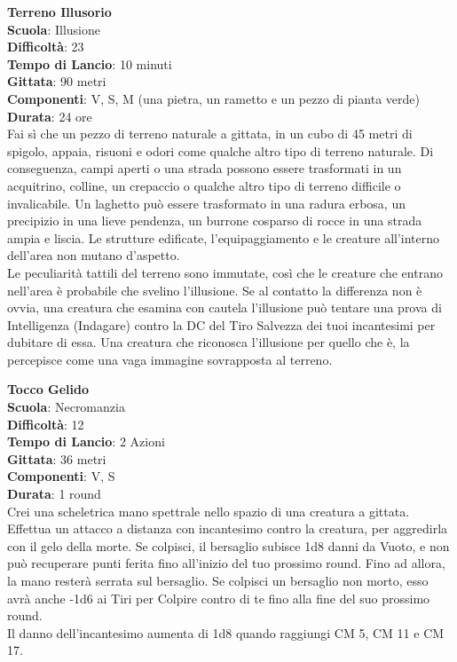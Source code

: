 \begin{multicols}{2}
\medskip\textbf{Terreno Illusorio}\\
\textbf{Scuola}: Illusione\\
\textbf{Difficoltà}: 23\\
\textbf{Tempo di Lancio}: 10 minuti\\
\textbf{Gittata}: 90 metri\\
\textbf{Componenti}: V, S, M (una pietra, un rametto e un pezzo di pianta verde)\\
\textbf{Durata}: 24 ore \\
Fai sì che un pezzo di terreno naturale a gittata, in un cubo di 45 metri di spigolo, appaia, risuoni e odori come qualche altro tipo di terreno naturale. Di conseguenza, campi aperti o una strada possono essere trasformati in un acquitrino, colline, un crepaccio o qualche altro tipo di terreno difficile o invalicabile. Un laghetto può essere trasformato in una radura erbosa, un precipizio in una lieve pendenza, un burrone cosparso di rocce in una strada ampia e liscia. Le strutture edificate, l'equipaggiamento e le creature all'interno dell'area non mutano d'aspetto.\\
Le peculiarità tattili del terreno sono immutate, così che le creature che entrano nell'area è probabile che svelino l'illusione. Se al contatto la differenza non è ovvia, una creatura che esamina con cautela l'illusione può tentare una prova di Intelligenza (Indagare) contro la DC del Tiro Salvezza dei tuoi incantesimi per dubitare di essa. Una creatura che riconosca l'illusione per quello che è, la percepisce come una vaga immagine sovrapposta al terreno.

\medskip\textbf{Tocco Gelido}\\
\textbf{Scuola}: Necromanzia\\
\textbf{Difficoltà}: 12\\
\textbf{Tempo di Lancio}: 2 Azioni\\
\textbf{Gittata}: 36 metri\\
\textbf{Componenti}: V, S\\
\textbf{Durata}: 1 round\\
Crei una scheletrica mano spettrale nello spazio di una creatura a gittata. Effettua un attacco a distanza con incantesimo contro la creatura, per aggredirla con il gelo della morte. Se colpisci, il bersaglio subisce 1d8 danni da Vuoto, e non può recuperare punti ferita fino all'inizio del tuo prossimo round. Fino ad allora, la mano resterà serrata sul bersaglio. Se colpisci un bersaglio non morto, esso avrà anche -1d6 ai Tiri per Colpire contro di te fino alla fine del suo prossimo round.\\
Il danno dell'incantesimo aumenta di 1d8 quando raggiungi CM 5, CM 11 e CM 17.


\end{multicols}
